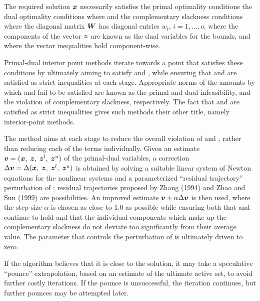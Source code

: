 \documentclass{galahad}
\begin{document}

\galmethod
The required solution ${\bm{x}}$ necessarily satisfies
the primal optimality conditions
the dual optimality conditions
where
and the complementary slackness conditions
where the diagonal matrix ${\bm{W}}$ has diagonal entries $w_i$,
$i = 1, \ldots , o$, where the components of the vector ${\bm{z}}$ are
known as the dual variables for the bounds,
and where the vector inequalities hold component-wise.

Primal-dual interior point methods iterate towards a point
that satisfies these conditions by ultimately aiming to satisfy
 and , while ensuring that
 and  are
satisfied as strict inequalities at each stage.
Appropriate norms of the amounts by
which  and  fail to be satisfied are known as the
primal and dual infeasibility, and the violation of complementary slackness,
respectively. The fact that  and  are satisfied as strict
inequalities gives such methods their other title, namely
interior-point methods.

The method aims at each stage to reduce the
overall violation of  and ,
rather than reducing each of the terms individually. Given an estimate
${\bm{v}} = ({\bm{x}}, \; {\bm{z}}, \; {\bm{z}}^{l}, \; {\bm{z}}^{u})$
of the primal-dual variables, a correction
$\Delta {\bm{v}} = \Delta ({\bm{x}}, \;{\bm{z}},\;{\bm{z}}^{l} ,\;{\bm{z}}^{u} )$
is obtained by solving a suitable linear system of Newton equations for the
nonlinear systems  and a parameterized ``residual
trajectory'' perturbation of ; residual trajectories
proposed by Zhang (1994) and Zhao and Sun (1999) are possibilities.
An improved estimate ${\bm{v}} + \alpha \Delta {\bm{v}}$
is then used, where the step-size $\alpha$
is chosen as close to 1.0 as possible while ensuring both that
 and  continue to hold and that the individual components
which make up the complementary slackness
 do not deviate too significantly
from their average value. The parameter that controls the perturbation
of  is ultimately driven to zero.

If the algorithm believes that it is close to the solution, it may take a
speculative ``pounce'' extrapolation, based on an estimate of the ultimate 
active set, to avoid further costly iterations. If the pounce is unsuccessful, 
the iteration continues, but further pounces may be attempted later.
\end{document}
